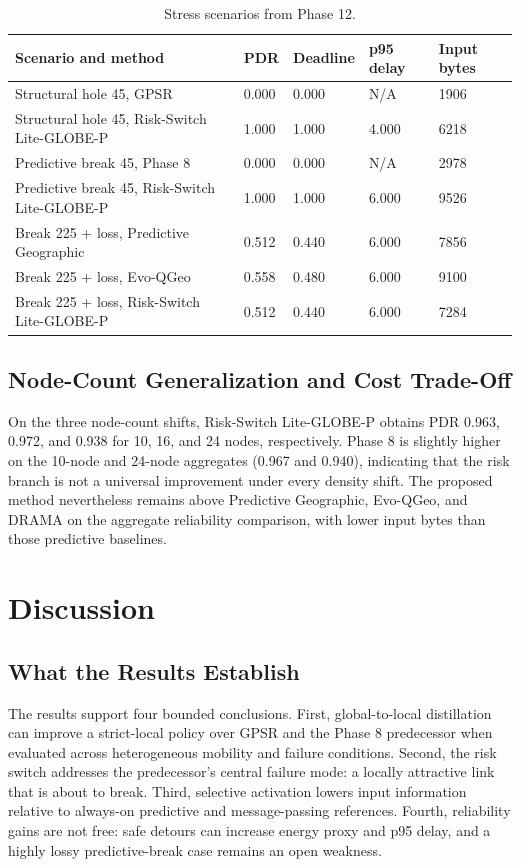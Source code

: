 \documentclass[drones,article,submit,moreauthors]{Definitions/mdpi}
\newcommand{\method}{Risk-Switch Lite-GLOBE-P}
\begin{document}
\begin{table}[H]
\caption{Stress scenarios from Phase 12.}
\label{tab:stress}
\centering
\small
\begin{tabularx}{\textwidth}{lYYYY}
\toprule
Scenario and method & PDR & Deadline & p95 delay & Input bytes \\
\midrule
Structural hole 45, GPSR & 0.000 & 0.000 & N/A & 1906 \\
Structural hole 45, \method & 1.000 & 1.000 & 4.000 & 6218 \\
Predictive break 45, Phase 8 & 0.000 & 0.000 & N/A & 2978 \\
Predictive break 45, \method & 1.000 & 1.000 & 6.000 & 9526 \\
Break 225 + loss, Predictive Geographic & 0.512 & 0.440 & 6.000 & 7856 \\
Break 225 + loss, Evo-QGeo & 0.558 & 0.480 & 6.000 & 9100 \\
Break 225 + loss, \method & 0.512 & 0.440 & 6.000 & 7284 \\
\bottomrule
\end{tabularx}
\end{table}

\subsection{Node-Count Generalization and Cost Trade-Off}

On the three node-count shifts, \method{} obtains PDR 0.963, 0.972, and 0.938 for 10, 16, and 24 nodes, respectively. Phase 8 is slightly higher on the 10-node and 24-node aggregates (0.967 and 0.940), indicating that the risk branch is not a universal improvement under every density shift. The proposed method nevertheless remains above Predictive Geographic, Evo-QGeo, and DRAMA on the aggregate reliability comparison, with lower input bytes than those predictive baselines.

\section{Discussion}

\subsection{What the Results Establish}

The results support four bounded conclusions. First, global-to-local distillation can improve a strict-local policy over GPSR and the Phase 8 predecessor when evaluated across heterogeneous mobility and failure conditions. Second, the risk switch addresses the predecessor's central failure mode: a locally attractive link that is about to break. Third, selective activation lowers input information relative to always-on predictive and message-passing references. Fourth, reliability gains are not free: safe detours can increase energy proxy and p95 delay, and a highly lossy predictive-break case remains an open weakness.
\end{document}
